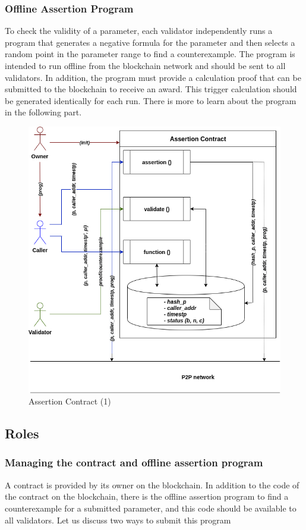 \documentclass[runningheads]{llncs}
\begin{document}
\subsubsection{Offline Assertion Program}
To check the validity of a parameter, each validator independently runs a program that generates a negative formula for the parameter and then selects a random point in the parameter range to find a counterexample. The program is intended to run offline from the blockchain network and should be sent to all validators. In addition, the program must provide a calculation proof that can be submitted to the blockchain to receive an award. This trigger calculation should be generated identically for each run. There is more to learn about the program in the following part.
\begin{figure}
\centering
\includegraphics[scale=.6]{assertion_1}
\caption{Assertion Contract (1)}
\end{figure}

\subsection{Roles}
\subsubsection{Managing the contract and offline assertion program}
A contract is provided by its owner on the blockchain. In addition to the code of the contract on the blockchain, there is the offline assertion program to find a counterexample for a submitted parameter, and this code should be available to all validators. Let us discuss two ways to submit this program 
\end{document}
